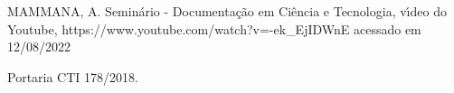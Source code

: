 \documentclass[
12pt,		%
openright,	%
twoside,  %
a4paper,			%
chapter=TITLE,		%
english,			%
french,				%
spanish,			%
brazil				%
]{USPSC-classe/USPSC_RedarTex}
\begin{document}
\begin{flushleft}
\begin{flushleft}
\begin{flushleft}
\begin{flushleft}
\begin{flushleft}
\begin{flushleft}
\begin{flushleft}
\begin{flushleft}
\begin{flushleft}
\begin{flushleft}
[MAMMANA, 2020] MAMMANA, A. Semin\'ario - Documenta\c{c}\~ao em Ci\^encia e Tecnologia, v\'{\i}deo do Youtube, https://www.youtube.com/watch?v=-ek\_EjIDWnE acessado em 12/08/2022
\end{flushleft}


\end{flushleft}


\end{flushleft}


\end{flushleft}


\end{flushleft}


\end{flushleft}


\end{flushleft}


\end{flushleft}


\end{flushleft}


\end{flushleft}


\begin{flushleft}
\begin{flushleft}
\begin{flushleft}
\begin{flushleft}
\begin{flushleft}
\begin{flushleft}
\begin{flushleft}
\begin{flushleft}
\begin{flushleft}
\begin{flushleft}
[CTI, 2018] Portaria CTI 178/2018.
\end{flushleft}


\end{flushleft}


\end{flushleft}


\end{flushleft}


\end{flushleft}


\end{flushleft}


\end{flushleft}


\end{flushleft}


\end{flushleft}


\end{flushleft}
\end{document}

